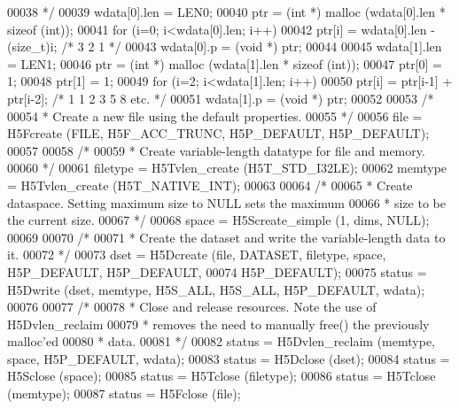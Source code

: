 \begin{DoxyCode}
00038 \textcolor{comment}{     */}
00039     wdata[0].len = LEN0;
00040     ptr = (\textcolor{keywordtype}{int} *) malloc (wdata[0].len * \textcolor{keyword}{sizeof} (\textcolor{keywordtype}{int}));
00041     \textcolor{keywordflow}{for} (i=0; i<wdata[0].len; i++)
00042         ptr[i] = wdata[0].len - (\textcolor{keywordtype}{size\_t})i;       \textcolor{comment}{/* 3 2 1 */}
00043     wdata[0].p = (\textcolor{keywordtype}{void} *) ptr;
00044 
00045     wdata[1].len = LEN1;
00046     ptr = (\textcolor{keywordtype}{int} *) malloc (wdata[1].len * \textcolor{keyword}{sizeof} (\textcolor{keywordtype}{int}));
00047     ptr[0] = 1;
00048     ptr[1] = 1;
00049     \textcolor{keywordflow}{for} (i=2; i<wdata[1].len; i++)
00050         ptr[i] = ptr[i-1] + ptr[i-2];   \textcolor{comment}{/* 1 1 2 3 5 8 etc. */}
00051     wdata[1].p = (\textcolor{keywordtype}{void} *) ptr;
00052 
00053     \textcolor{comment}{/*}
00054 \textcolor{comment}{     * Create a new file using the default properties.}
00055 \textcolor{comment}{     */}
00056     file = H5Fcreate (FILE, H5F\_ACC\_TRUNC, H5P\_DEFAULT, H5P\_DEFAULT);
00057 
00058     \textcolor{comment}{/*}
00059 \textcolor{comment}{     * Create variable-length datatype for file and memory.}
00060 \textcolor{comment}{     */}
00061     filetype = H5Tvlen\_create (H5T\_STD\_I32LE);
00062     memtype = H5Tvlen\_create (H5T\_NATIVE\_INT);
00063 
00064     \textcolor{comment}{/*}
00065 \textcolor{comment}{     * Create dataspace.  Setting maximum size to NULL sets the maximum}
00066 \textcolor{comment}{     * size to be the current size.}
00067 \textcolor{comment}{     */}
00068     space = H5Screate\_simple (1, dims, NULL);
00069 
00070     \textcolor{comment}{/*}
00071 \textcolor{comment}{     * Create the dataset and write the variable-length data to it.}
00072 \textcolor{comment}{     */}
00073     dset = H5Dcreate (file, DATASET, filetype, space, H5P\_DEFAULT, H5P\_DEFAULT,
00074                 H5P\_DEFAULT);
00075     status = H5Dwrite (dset, memtype, H5S\_ALL, H5S\_ALL, H5P\_DEFAULT, wdata);
00076 
00077     \textcolor{comment}{/*}
00078 \textcolor{comment}{     * Close and release resources.  Note the use of H5Dvlen\_reclaim}
00079 \textcolor{comment}{     * removes the need to manually free() the previously malloc'ed}
00080 \textcolor{comment}{     * data.}
00081 \textcolor{comment}{     */}
00082     status = H5Dvlen\_reclaim (memtype, space, H5P\_DEFAULT, wdata);
00083     status = H5Dclose (dset);
00084     status = H5Sclose (space);
00085     status = H5Tclose (filetype);
00086     status = H5Tclose (memtype);
00087     status = H5Fclose (file);

\end{DoxyCode}
